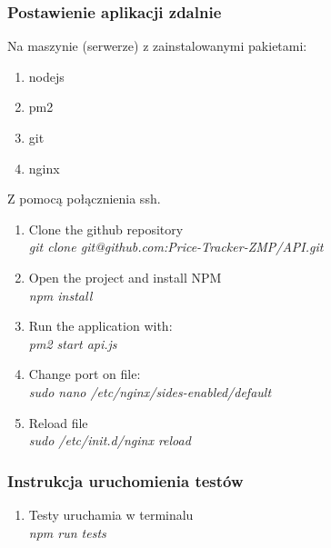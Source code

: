 \documentclass{article}
\begin{document}
        \subsubsection{Postawienie aplikacji zdalnie}
        Na maszynie (serwerze) z zainstalowanymi pakietami:\\
        \begin{enumerate}
            \item nodejs\\
            \item pm2\\
            \item git\\
            \item nginx\\
        \end{enumerate}
        Z pomocą połącznienia ssh.\\
        
        \begin{enumerate}
            \item Clone the github repository\\
                \emph{git clone git@github.com:Price-Tracker-ZMP/API.git} \\
            \item Open the project and install NPM\\
              \emph{npm install} \\
            \item Run the application with:\\
                \emph{pm2 start api.js} \\
            \item Change port on file:\\
                \emph{sudo nano /etc/nginx/sides-enabled/default} \\
            \item Reload file\\
                \emph{sudo /etc/init.d/nginx reload} \\
        \end{enumerate}
        
        \subsubsection{Instrukcja uruchomienia testów}
         \begin{enumerate}
            \item Testy uruchamia w terminalu\\
            \emph{npm run tests} \\
        \end{enumerate}
\end{document}
